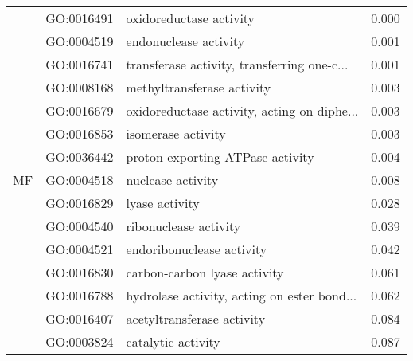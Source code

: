 \begin{longtable}{lllr}
\multirow{15}{*}{MF} & GO:0016491 &                      oxidoreductase activity &         0.000 \\
   & GO:0004519 &                        endonuclease activity &         0.001 \\
   & GO:0016741 &  transferase activity, transferring one-c... &         0.001 \\
   & GO:0008168 &                   methyltransferase activity &         0.003 \\
   & GO:0016679 &  oxidoreductase activity, acting on diphe... &         0.003 \\
   & GO:0016853 &                           isomerase activity &         0.003 \\
   & GO:0036442 &             proton-exporting ATPase activity &         0.004 \\
   & GO:0004518 &                            nuclease activity &         0.008 \\
   & GO:0016829 &                               lyase activity &         0.028 \\
   & GO:0004540 &                        ribonuclease activity &         0.039 \\
   & GO:0004521 &                    endoribonuclease activity &         0.042 \\
   & GO:0016830 &                 carbon-carbon lyase activity &         0.061 \\
   & GO:0016788 &  hydrolase activity, acting on ester bond... &         0.062 \\
   & GO:0016407 &                   acetyltransferase activity &         0.084 \\
   & GO:0003824 &                           catalytic activity &         0.087 \\
\end{longtable}
